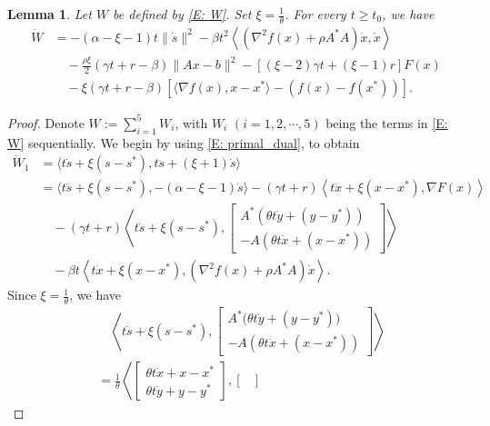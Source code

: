 \documentclass[pdflatex,sn-mathphys-num]{sn-jnl}
\theoremstyle{thmstyleone}
\newtheorem{lemma}[theorem]{Lemma}
\theoremstyle{thmstyletwo}
\theoremstyle{thmstylethree}
\begin{document}
\begin{lemma}\label{Lem: epsilon_dev}
Let $W$ be defined by \eqref{E: W}. Set $\xi = \frac{1}{\theta}$. For every $t\ge t_0$, we have
\begin{align*}
\dot{W}
&= -(\alpha-\xi-1)t\| \dot{s} \|^2
   -\beta t^2 \left\langle \left( \nabla^2 f(x) + \rho A^* A \right)\dot{x}, \dot{x} \right\rangle \\
&\quad - \frac{\rho\xi}{2}( \gamma t + r - \beta ) \| Ax-b \|^2   
  - [ (\xi-2)\gamma t + (\xi-1)r ] F(x) \\
&\quad -\xi( \gamma t + r - \beta ) \left[ \langle \nabla f(x), x-x^* \rangle - \left( f(x) - f(x^*) \right) \right].
\end{align*}
\end{lemma}


\begin{proof}
Denote $W := \sum_{i=1}^5 W_i$, with $W_i$ $(i=1,2,\cdots,5)$ being the terms in \eqref{E: W} sequentially. We begin by using \eqref{E: primal_dual}, to obtain
\begin{align*}
\dot{W}_1
&= \langle t\dot{s} + \xi(s-s^*), t\ddot{s} + (\xi + 1)\dot{s} \rangle \\
&= \langle t\dot{s} + \xi(s-s^*), -(\alpha-\xi-1)\dot{s} \rangle  
  - (\gamma t + r) \left\langle t\dot{x} + \xi(x-x^*), \nabla F(x) \right\rangle \\
&\quad - (\gamma t + r) \left\langle t\dot{s} + \xi(s-s^*), \begin{bmatrix}
 A^*\left( \theta t \dot{y} + (y - y^*) \right)\\
 -A \left( \theta t \dot{x} + (x-x^*) \right)
 \end{bmatrix} \right\rangle \\
&\quad - \beta t \left\langle t\dot{x} + \xi(x-x^*), \left( \nabla^2 f(x) + \rho A^* A \right)\dot{x} \right\rangle.
\end{align*}
Since $\xi = \frac{1}{\theta}$, we have
\begin{align*}
&\quad \left\langle t\dot{s} + \xi(s-s^*), \begin{bmatrix}
A^*\big( \theta t \dot{y} + (y - y^*) \big)\\
 -A \left( \theta t \dot{x} + (x-x^*) \right)
 \end{bmatrix} \right\rangle \\ 
 &= \frac{1}{\theta}\left\langle \begin{bmatrix}
 \theta t \dot{x} + x - x^*\\
\theta t \dot{y} + y-y^* 
 \end{bmatrix}, \begin{bmatrix}

\end{bmatrix}
\end{align*}
\end{proof}
\end{document}
